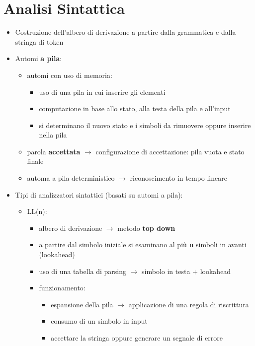 \documentclass[12pt]{extarticle}
\begin{document}
\newpage

\section*{Analisi Sintattica}

\begin{itemize}
  \item Costruzione dell'albero di derivazione a partire dalla grammatica e dalla stringa di token
  \item Automi \textbf{a pila}:
  \begin{itemize}
    \item automi con uso di memoria:
    \begin{itemize}
      \item uso di una pila in cui inserire gli elementi
      \item computazione in base allo stato, alla testa della pila e all'input
      \item si determinano il nuovo stato e i simboli da rimuovere oppure inserire nella pila
    \end{itemize}
    \item parola \textbf{accettata} $\rightarrow$ configurazione di accettazione: pila vuota e stato finale
    \item automa a pila deterministico $\rightarrow$ riconoscimento in tempo lineare
  \end{itemize}
  \item Tipi di analizzatori sintattici (basati su automi a pila):
  \begin{itemize}
    \item LL(n):
    \begin{itemize}
      \item albero di derivazione $\rightarrow$ metodo \textbf{top down}
      \item a partire dal simbolo iniziale si esaminano al più \textbf{n} simboli in avanti (lookahead)
      \item uso di una tabella di parsing $\rightarrow$ simbolo in testa $+$ lookahead
      \item funzionamento:
      \begin{itemize}
        \item espansione della pila $\rightarrow$ applicazione di una regola di riscrittura
        \item consumo di un simbolo in input 
        \item accettare la stringa oppure generare un segnale di errore

\end{itemize}
\end{itemize}
\end{itemize}
\end{itemize}
\end{document}
